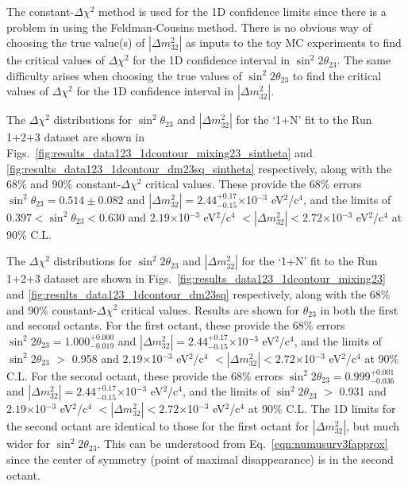 The constant-$\Delta \chi^{2}$ method is used for the 1D confidence
limits since there is a problem in using the Feldman-Cousins
method. There is no obvious way of choosing the true value(s) of
$|\Delta m_{32}^{2}|$ as inputs to the toy MC experiments to find the
critical values of $\Delta \chi^{2}$ for the 1D confidence interval in
$\sin^{2} 2\theta_{23}$. The same difficulty arises when choosing the
true values of $\sin^{2} 2\theta_{23}$ to find the critical values of
$\Delta \chi^{2}$ for the 1D confidence interval in $|\Delta
m_{32}^{2}|$.

The $\Delta\chi^2$ distributions for $\sin^{2}\theta_{23}$ and $|\Delta m^{2}_{32}|$ for the 
`1+N' fit to the Run 1+2+3 dataset are shown in Figs.\
\ref{fig:results_data123_1dcontour_mixing23_sintheta} and
\ref{fig:results_data123_1dcontour_dm23sq_sintheta} respectively, along with the
68\% and 90\% constant-$\Delta\chi^2$ critical values.
These provide the 68\% errors $\sin^{2}\theta_{23} = 0.514\pm0.082$
and $|\Delta m^2_{32}| = 2.44^{+0.17}_{-0.15}$$\times$10$^{-3}$ eV$^{2}$/c$^{4}$,
and the limits of
$0.397 < \sin^{2}\theta_{23} < 0.630$
and
$2.19$$\times$10$^{-3}$ eV$^{2}$/c$^{4}$ $< |\Delta m^2_{32}| < 2.72$$\times$10$^{-3}$ eV$^{2}$/c$^{4}$
at 90\% C.L.

The $\Delta\chi^2$ distributions for $\sin^{2}2\theta_{23}$ and $|\Delta m^{2}_{32}|$ for the 
`1+N' fit to the Run 1+2+3 dataset are shown in Figs.\
\ref{fig:results_data123_1dcontour_mixing23} and
\ref{fig:results_data123_1dcontour_dm23sq} respectively, along with the
68\% and 90\% constant-$\Delta\chi^2$ critical values.
Results are shown for $\theta_{23}$ in both the first and second octants.
For the first octant, these provide the 68\% errors $\sin^{2}2\theta_{23} = 1.000^{+0.000}_{-0.019}$
and $|\Delta m^2_{32}| = 2.44^{+0.17}_{-0.15}$$\times$10$^{-3}$ eV$^{2}$/c$^{4}$,
and the limits of $\sin^{2}2\theta_{23}$ $>$ 0.958 and
$2.19$$\times$10$^{-3}$ eV$^{2}$/c$^{4}$ $< |\Delta m^2_{32}| < 2.72$$\times$10$^{-3}$ eV$^{2}$/c$^{4}$
at 90\% C.L. 
For the second octant, these provide the 68\% errors $\sin^{2}2\theta_{23} = 0.999^{+0.001}_{-0.036}$
and $|\Delta m^2_{32}| = 2.44^{+0.17}_{-0.15}$$\times$10$^{-3}$ eV$^{2}$/c$^{4}$,
and the limits of $\sin^{2}2\theta_{23}$ $>$ 0.931 and
$2.19$$\times$10$^{-3}$ eV$^{2}$/c$^{4}$ $< |\Delta m^2_{32}| < 2.72$$\times$10$^{-3}$ eV$^{2}$/c$^{4}$
at 90\% C.L.
The 1D limits for the second octant are identical to those for the first octant for $|\Delta m^2_{32}|$,
but much wider for $\sin^{2}2\theta_{23}$.
This can be understood from Eq.\ \ref{eqn:numusurv3fapprox} since
the center of symmetry (point of maximal disappearance) is in the second octant.

